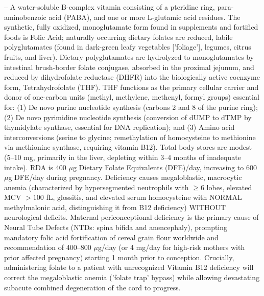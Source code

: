 -- A water-soluble B-complex vitamin consisting of a pteridine ring, para-aminobenzoic acid (PABA), and one or more L-glutamic acid residues. The synthetic, fully oxidized, monoglutamate form found in supplements and fortified foods is Folic Acid; naturally occurring dietary folates are reduced, labile polyglutamates (found in dark-green leafy vegetables ['foliage'], legumes, citrus fruits, and liver). Dietary polyglutamates are hydrolyzed to monoglutamates by intestinal brush-border folate conjugase, absorbed in the proximal jejunum, and reduced by dihydrofolate reductase (DHFR) into the biologically active coenzyme form, Tetrahydrofolate (THF). THF functions as the primary cellular carrier and donor of one-carbon units (methyl, methylene, methenyl, formyl groups) essential for: (1) De novo purine nucleotide synthesis (carbons 2 and 8 of the purine ring); (2) De novo pyrimidine nucleotide synthesis (conversion of dUMP to dTMP by thymidylate synthase, essential for DNA replication); and (3) Amino acid interconversions (serine to glycine; remethylation of homocysteine to methionine via methionine synthase, requiring vitamin B12). Total body stores are modest (5--10 mg, primarily in the liver, depleting within 3--4 months of inadequate intake). RDA is 400 $\mu$g Dietary Folate Equivalents (DFE)/day, increasing to 600 $\mu$g DFE/day during pregnancy. Deficiency causes megaloblastic, macrocytic anemia (characterized by hypersegmented neutrophils with $\ge 6$ lobes, elevated MCV $>100$ fL, glossitis, and elevated serum homocysteine with NORMAL methylmalonic acid, distinguishing it from B12 deficiency) WITHOUT neurological deficits. Maternal periconceptional deficiency is the primary cause of Neural Tube Defects (NTDs: spina bifida and anencephaly), prompting mandatory folic acid fortification of cereal grain flour worldwide and recommendation of 400--800 $\mu$g/day (or 4 mg/day for high-risk mothers with prior affected pregnancy) starting 1 month prior to conception. Crucially, administering folate to a patient with unrecognized Vitamin B12 deficiency will correct the megaloblastic anemia ('folate trap' bypass) while allowing devastating subacute combined degeneration of the cord to progress.

